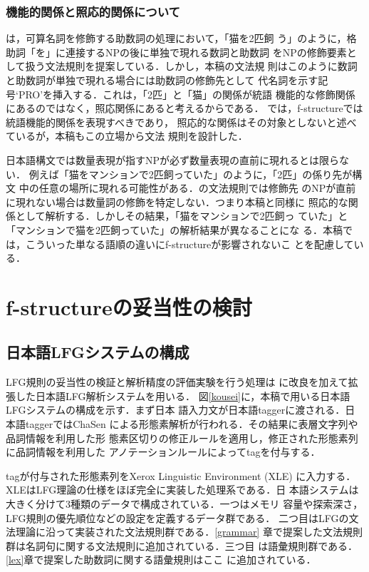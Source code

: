 \documentclass[japanese]{jnlp_1.4}
\begin{document}
\subsubsection{機能的関係と照応的関係について}

 \cite{Bender}は，可算名詞を修飾する助数詞の処理において，「猫を2匹飼
 う」のように，格助詞「を」に連接するNPの後に単独で現れる数詞と助数詞
 をNPの修飾要素として扱う文法規則を提案している．しかし，本稿の文法規
 則はこのように数詞と助数詞が単独で現れる場合には助数詞の修飾先として
 代名詞を示す記号`PRO'を挿入する．これは，「2匹」と「猫」の関係が統語
 機能的な修飾関係にあるのではなく，照応関係にあると考えるからである．
 \cite{Bresnan01}では，f-structureでは統語機能的関係を表現すべきであり，
 照応的な関係はその対象としないと述べているが，本稿もこの立場から文法
 規則を設計した．

日本語構文では数量表現が指すNPが必ず数量表現の直前に現れるとは限らない．
例えば「猫をマンションで2匹飼っていた」のように，「2匹」の係り先が構文
中の任意の場所に現れる可能性がある．\cite{Bender}の文法規則では修飾先
のNPが直前に現れない場合は数量詞の修飾を特定しない．つまり本稿と同様に
照応的な関係として解析する．しかしその結果，「猫をマンションで2匹飼っ
ていた」と「マンションで猫を2匹飼っていた」の解析結果が異なることにな
る．本稿では，こういった単なる語順の違いにf-structureが影響されないこ
とを配慮している．



\section{\label{fstr}f-structureの妥当性の検討}

\subsection{日本語LFGシステムの構成}

LFG規則の妥当性の検証と解析精度の評価実験を行う処理は
\cite{Masuichi2003}に改良を加えて拡張した日本語LFG解析システムを用いる．
図\ref{kousei}に，本稿で用いる日本語LFGシステムの構成を示す．まず日本
語入力文が日本語taggerに渡される．日本語taggerではChaSen \linebreak
\cite{chaurl}
による形態素解析が行われる．その結果に表層文字列や品詞情報を利用した形
態素区切りの修正ルールを適用し，修正された形態素列に品詞情報を利用した
アノテーションルールによってtagを付与する．

tagが付与された形態素列をXerox Linguistic Environment (XLE) に入力する．
XLEはLFG理論の仕様をほぼ完全に実装した処理系である\cite{Maxwell93}．日
本語システムは大きく分けて3種類のデータで構成されている．一つはメモリ
容量や探索深さ，LFG規則の優先順位などの設定を定義するデータ群である．
二つ目はLFGの文法理論に沿って実装された文法規則群である．\ref{grammar}
章で提案した文法規則群は名詞句に関する文法規則に追加されている．三つ目
は語彙規則群である．\ref{lex}章で提案した助数詞に関する語彙規則はここ
に追加されている．
\end{document}
